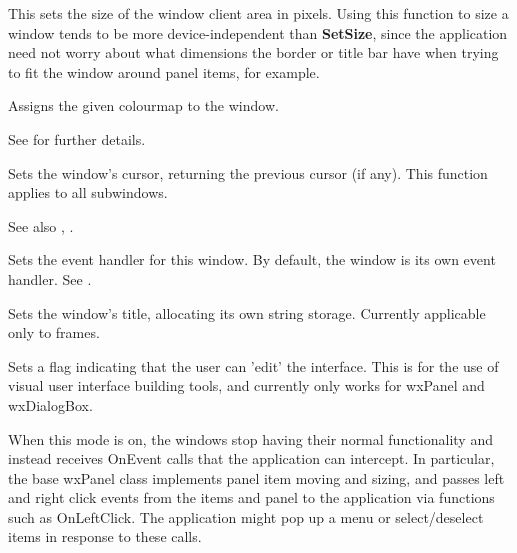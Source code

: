 

This sets the size of the window client area in pixels. Using this function to size a window
tends to be more device-independent than {\bf SetSize}, since the application need not
worry about what dimensions the border or title bar have when trying to fit the window
around panel items, for example.



Assigns the given colourmap to the window.

See  for further details.

\label{winsetcursor}


Sets the window's cursor, returning the previous cursor (if any). This
function applies to all subwindows.

See also , .

\label{wxwindowseteventhandler}


Sets the event handler for this window. By default, the window is its
own event handler. See .



Sets the window's title, allocating its own string storage. Currently
applicable only to frames.

\label{setusereditmode}


Sets a flag indicating that the user can 'edit' the interface.
This is for the use of visual user interface building tools, and
currently only works for wxPanel and wxDialogBox.

When this mode is on, the windows stop having their normal
functionality and instead receives OnEvent calls that the
application can intercept. In particular, the base wxPanel
class implements panel item moving and sizing, and
passes left and right click events from the items and panel
to the application via functions such as OnLeftClick.
The application might pop up a menu or select/deselect items
in response to these calls.

